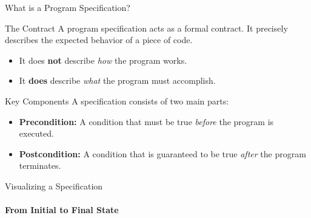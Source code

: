 \begin{frame}{What is a Program Specification?}
    \begin{block}{The Contract}
        A program specification acts as a formal contract. It precisely describes the expected behavior of a piece of code.
        \begin{itemize}
            \item It does \textbf{not} describe \emph{how} the program works.
            \item It \textbf{does} describe \emph{what} the program must accomplish.
        \end{itemize}
    \end{block}
    \begin{block}{Key Components}
        A specification consists of two main parts:
        \begin{itemize}
            \item \textbf{Precondition:} A condition that must be true \emph{before} the program is executed.
            \item \textbf{Postcondition:} A condition that is guaranteed to be true \emph{after} the program terminates.
        \end{itemize}
    \end{block}
\end{frame}

\begin{frame}{Visualizing a Specification}
    \framesubtitle{From Initial to Final State}
    \begin{center}
    \end{center}
\end{frame}


